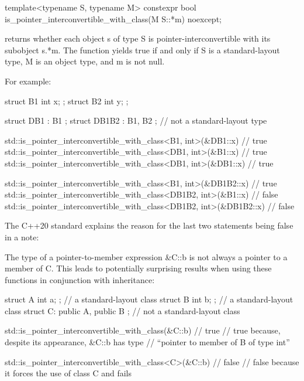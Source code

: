 
\begin{cpp}
template<typename S, typename M>
constexpr bool is_pointer_interconvertible_with_class(M S::*m) noexcept;
\end{cpp}

returns whether each object s of type S is pointer-interconvertible with its subobject s.*m. The function yields true if and only if S is a standard-layout type, M is an object type, and m is not null.

For example:

\begin{cpp}
struct B1 { int x; };
struct B2 { int y; };

struct DB1 : B1 {};
struct DB1B2 : B1, B2 {}; // not a standard-layout type

std::is_pointer_interconvertible_with_class<B1, int>(&DB1::x) // true
std::is_pointer_interconvertible_with_class<DB1, int>(&B1::x) // true
std::is_pointer_interconvertible_with_class<DB1, int>(&DB1::x) // true

std::is_pointer_interconvertible_with_class<B1, int>(&DB1B2::x) // true
std::is_pointer_interconvertible_with_class<DB1B2, int>(&B1::x) // false
std::is_pointer_interconvertible_with_class<DB1B2, int>(&DB1B2::x) // false
\end{cpp}

The C++20 standard explains the reason for the last two statements being false in a note: 

The type of a pointer-to-member expression \&C::b is not always a pointer to a member of C. This leads to potentially surprising results when using these functions in conjunction with inheritance:

\begin{cpp}
struct A { int a; }; // a standard-layout class
struct B { int b; }; // a standard-layout class
struct C: public A, public B { }; // not a standard-layout class

std::is_pointer_interconvertible_with_class(&C::b) // true
// true because, despite its appearance, &C::b has type
// “pointer to member of B of type int”

std::is_pointer_interconvertible_with_class<C>(&C::b) // false
// false because it forces the use of class C and fails
\end{cpp}





